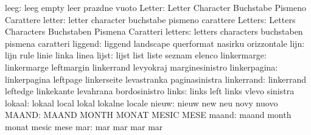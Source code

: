                      leeg: leeg                      empty
                           leer                      prazdne
                           vuoto
                   Letter: Letter                    Character
                           Buchstabe                 Pismeno
                           Carattere
                   letter: letter                    character
                           buchstabe                 pismeno
                           carattere
                  Letters: Letters                   Characters
                           Buchstaben                Pismena
                           Caratteri
                  letters: letters                   characters
                           buchstaben                pismena
                           caratteri
                  liggend: liggend                   landscape
                           querformat                nasirku
                           orizzontale
                     lijn: lijn                      rule
                           linie                     linka
                           linea
                    lijst: lijst                     list
                           liste                     seznam
                           elenco
              linkermarge: linkermarge               leftmargin
                           linkerrand                levyokraj
                           marginesinistro
             linkerpagina: linkerpagina              leftpage
                           linkerseite               levastranka
                           paginasinistra
               linkerrand: linkerrand                leftedge
                           linkekante                levahrana
                           bordosinistro
                    links: links                     left
                           links                     vlevo
                           sinistra
                   lokaal: lokaal                    local
                           lokal                     lokalne
                           locale
                    nieuw: nieuw                     new
                           neu                       novy
                           nuovo
                    MAAND: MAAND                     MONTH
                           MONAT                     MESIC
                           MESE
                    maand: maand                     month
                           monat                     mesic
                           mese
                      mar: mar                       mar
                           mar                       mar
